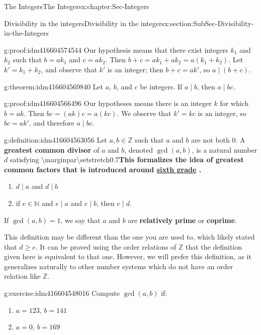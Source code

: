 \documentclass[oneside,10pt,]{book}
\newcommand{\terminology}[1]{\textbf{#1}}
\numberwithin{equation}{section}
\renewcommand{\ge}{\geqslant}
\def\Z{{\mathbb Z}}
\def\N{{\mathbb N}}
\begin{document}
\begin{chapterptx}{The Integers}{}{The Integers}{}{}{x:chapter:Sec-Integers}
\begin{sectionptx}{Divisibility in the integers}{}{Divisibility in the integers}{}{}{x:section:SubSec-Divisibility-in-the-Integers}
\begin{proofptx}{}{g:proof:idm416604574544}
Our hypothesis means that there exist integers \(k_1\) and \(k_2\) such that \(b = a k_1\) and \(c = a k_2\). Then \(b+c = a k_1 + a k_2 = a(k_1 + k_2)\). Let \(k' = k_1 + k_2\), and observe that \(k'\) is an integer; then \(b+c = a k'\), so \(a\mid (b+c)\).%
\end{proofptx}
\begin{theorem}{}{}{g:theorem:idm416604569840}%
Let \(a\), \(b\), and \(c\) be integers. If \(a\mid b\), then \(a\mid bc\).%
\end{theorem}
\begin{proofptx}{}{g:proof:idm416604566496}
Our hypotheses means there is an integer \(k\) for which \(b = ak\). Then \(bc = (ak)c = a(kc)\). We observe that \(k' = kc\) is an integer, so \(bc = ak'\), and therefore \(a\mid bc\).%
\end{proofptx}
\begin{definition}{}{g:definition:idm416604563056}%
Let \(a,b\in \Z\) such that \(a\) and \(b\) are not both 0. A \terminology{greatest common divisor} of \(a\) and \(b\), denoted \(\gcd(a,b)\), is a natural number \(d\) satisfying \textbackslash{}marginpar\textbraceleft{}\textbackslash{}setstretch\textbraceleft{}0.7\textbraceright{}\terminology{This formalizes the idea of greatest common factors that is introduced around \href{http://www.corestandards.org/Math/Content/6/NS/B/4/}{sixth grade} .}\textbraceright{}%
\begin{enumerate}
\item{}\(d\mid a\) and \(d\mid b\)%
\item{}if \(e\in \N\) and \(e\mid a\) and \(e\mid b\), then \(e\mid d\).%
\end{enumerate}
%
\par
If \(\gcd(a,b) = 1\), we say that \(a\) and \(b\) are \terminology{relatively prime} or \terminology{coprime}.%
\end{definition}
This definition may be different than the one you are used to, which likely stated that \(d \ge e\). It can be proved using the order relations of \(\Z\) that the definition given here is equivalent to that one. However, we will prefer this definition, as it generalizes naturally to other number systems which do not have an order relation like \(\Z\).%
\begin{inlineexercise}{}{g:exercise:idm416604548016}%
Compute \(\gcd(a,b)\) if:%
\begin{enumerate}
\item{}\(a = 123\), \(b = 141\)%
\item{}\(a = 0\), \(b = 169\)%

\end{enumerate}
\end{inlineexercise}
\end{sectionptx}
\end{chapterptx}
\end{document}
